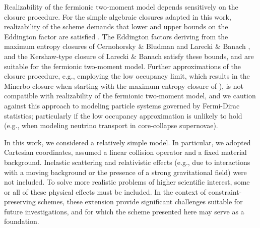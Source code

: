 Realizability of the fermionic two-moment model depends sensitively on the closure procedure.  
For the simple algebraic closures adapted in this work, realizability of the scheme demands that lower and upper bounds on the Eddington factor are satisfied \cite{levermore_1984,lareckiBanach_2011}.  
The Eddington factors deriving from the maximum entropy closures of Cernohorsky \& Bludman \cite{cernohorskyBludman_1994} and Larecki \& Banach \cite{lareckiBanach_2011}, and the Kershaw-type closure of Larecki \& Banach \cite{banachLarecki_2017a} satisfy these bounds, and are suitable for the fermionic two-moment model.  
Further approximations of the closure procedure, e.g., employing the low occupancy limit, which results in the Minerbo closure \cite{minerbo_1978} when starting with the maximum entropy closure of \cite{cernohorskyBludman_1994}), is not compatible with realizability of the fermionic two-moment model, and we caution against this approach to modeling particle systems governed by Fermi-Dirac statistics; particularly if the low occupancy approximation is unlikely to hold (e.g., when modeling neutrino transport in core-collapse supernovae).  

In this work, we considered a relatively simple model.  
In particular, we adopted Cartesian coordinates, assumed a linear collision operator and a fixed material background.  
Inelastic scattering and relativistic effects (e.g., due to interactions with a moving background or the presence of a strong gravitational field) were not included.  
To solve more realistic problems of higher scientific interest, some or all of these physical effects must be included.  
In the context of constraint-preserving schemes, these extension provide significant challenges suitable for future investigations, and for which the scheme presented here may serve as a foundation.  